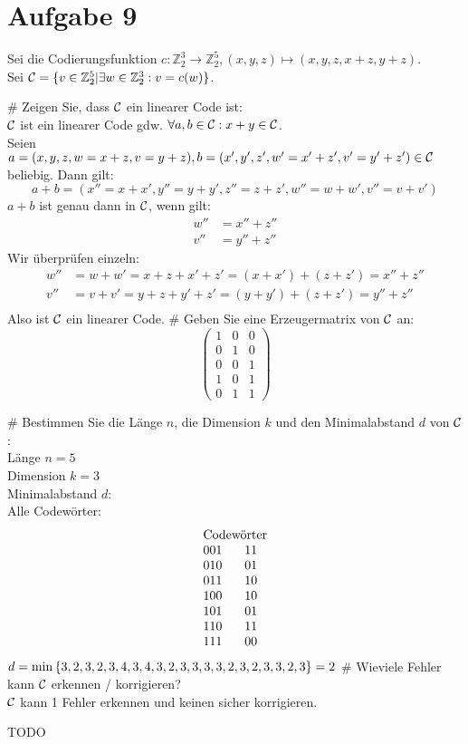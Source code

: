 \section*{Aufgabe 9}

Sei die Codierungsfunktion $c: \mathbb{Z}^3_2 \rightarrow \mathbb{Z}^5_2 , (x,y,z) \mapsto (x,y,z,x+z,y+z)$.\\
Sei $\mathcal{C} = \lbrace v \in \mathbb{Z}^5_2 | \exists w \in \mathbb{Z}^3_2: v = c(w) \rbrace$.
\begin{myList}
# Zeigen Sie, dass $\mathcal{C}$ ein linearer Code ist:\\
$\mathcal{C}$ ist ein linearer Code gdw. $\forall a, b\in\mathcal{C}: x+y\in\mathcal{C}$.\\
Seien $a = (x, y, z, w=x+z, v=y+z), b=(x', y', z', w'=x'+z', v'=y'+z')\in\mathcal{C}$ beliebig. Dann gilt:
$$a+b = (x'' = x+x', y'' = y+y', z'' = z+z', w'' = w+w', v'' = v+v')$$
$a+b$ ist genau dann in $\mathcal{C}$, wenn gilt:
\begin{align*}
w'' &= x''+z''\\
v'' &= y''+z''
\end{align*}
Wir überprüfen einzeln:
\begin{align*}
w'' &= w+w' = x+z+x'+z'=(x+x')+(z+z') = x'' + z''\\
v'' &= v+v' = y+z+y'+z'=(y+y')+(z+z') = y'' + z''\\
\end{align*}
Also ist $\mathcal{C}$ ein linearer Code.
# Geben Sie eine Erzeugermatrix von $\mathcal{C}$ an:\\
$$\begin{pmatrix}
1 & 0 & 0\\
0 & 1 & 0\\
0 & 0 & 1\\
1 & 0 & 1\\
0 & 1 & 1
\end{pmatrix}$$

#
Bestimmen Sie die Länge $n$, die Dimension $k$ und den Minimalabstand $d$ von $\mathcal{C}$:\\
Länge $n = 5$\\
Dimension $k = 3$\\
Minimalabstand $d$:\\
Alle Codewörter:
$$\begin{array}{cc}
\multicolumn{2}{c}{\text{Codewörter}}\\
001 & 11 \\
010 & 01 \\
011 & 10 \\
100 & 10 \\
101 & 01 \\
110 & 11 \\
111 & 00 \\
\end{array}$$
$d=\min\left\lbrace 3, 2, 3, 2, 3, 4, 3, 4, 3, 2, 3, 3, 3, 3, 2, 3, 2, 3, 3, 2, 3 \right\rbrace = 2$ 
# Wieviele Fehler kann $\mathcal{C}$ erkennen / korrigieren?\\
$\mathcal{C}$ kann 1 Fehler erkennen und keinen sicher korrigieren.

TODO
\end{myList}


